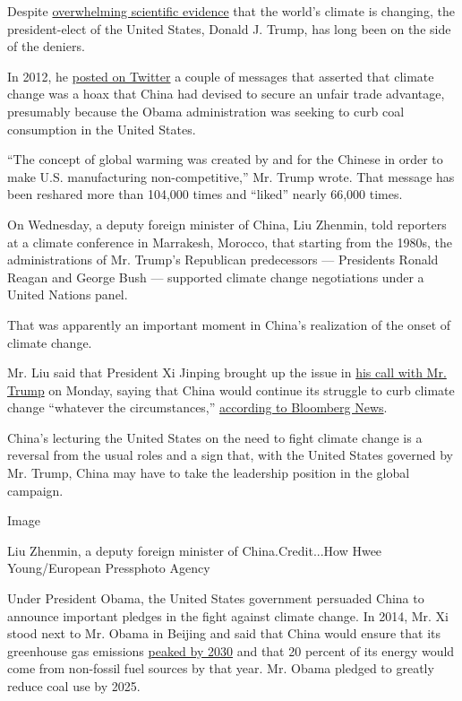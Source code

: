 Despite
\href{http://dotearth.blogs.nytimes3xbfgragh.onion/2016/09/21/trumps-stance-on-the-paris-climate-agreement-is-criticized-by-375-scientists/}{overwhelming
scientific evidence} that the world's climate is changing, the
president-elect of the United States, Donald J. Trump, has long been on
the side of the deniers.

In 2012, he
\href{https://twitter.com/realdonaldtrump/status/265895292191248385?lang=en}{posted
on Twitter} a couple of messages that asserted that climate change was a
hoax that China had devised to secure an unfair trade advantage,
presumably because the Obama administration was seeking to curb coal
consumption in the United States.

``The concept of global warming was created by and for the Chinese in
order to make U.S. manufacturing non-competitive,'' Mr. Trump wrote.
That message has been reshared more than 104,000 times and ``liked''
nearly 66,000 times.

On Wednesday, a deputy foreign minister of China, Liu Zhenmin, told
reporters at a climate conference in Marrakesh, Morocco, that starting
from the 1980s, the administrations of Mr. Trump's Republican
predecessors --- Presidents Ronald Reagan and George Bush --- supported
climate change negotiations under a United Nations panel.

That was apparently an important moment in China's realization of the
onset of climate change.

Mr. Liu said that President Xi Jinping brought up the issue in
\href{http://www.nytimes3xbfgragh.onion/2016/11/15/world/asia/trump-china-xi-jinping.html}{his
call with Mr. Trump} on Monday, saying that China would continue its
struggle to curb climate change ``whatever the circumstances,''
\href{http://www.bloomberg.com/news/articles/2016-11-16/china-tells-trump-that-climate-change-is-no-hoax-it-invented}{according
to Bloomberg News}.

China's lecturing the United States on the need to fight climate change
is a reversal from the usual roles and a sign that, with the United
States governed by Mr. Trump, China may have to take the leadership
position in the global campaign.

Image

Liu Zhenmin, a deputy foreign minister of China.Credit...How Hwee
Young/European Pressphoto Agency

Under President Obama, the United States government persuaded China to
announce important pledges in the fight against climate change. In 2014,
Mr. Xi stood next to Mr. Obama in Beijing and said that China would
ensure that its greenhouse gas emissions
\href{http://www.nytimes3xbfgragh.onion/2014/11/12/world/asia/china-us-xi-obama-apec.html}{peaked
by 2030} and that 20 percent of its energy would come from non-fossil
fuel sources by that year. Mr. Obama pledged to greatly reduce coal use
by 2025.

